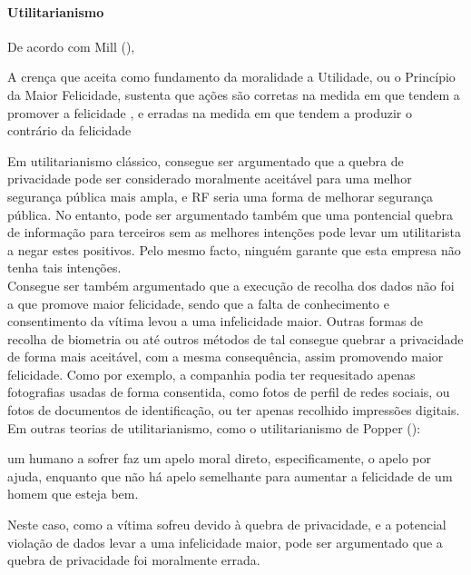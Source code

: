 \documentclass[12pt]{../diazessay}
\begin{document}
\paragraph{Utilitarianismo}
De acordo com Mill (\citeyear{mill}), 
\begin{displayquote}
  A crença que aceita como fundamento da moralidade a Utilidade, ou o Princípio da Maior Felicidade, sustenta que ações são corretas na medida em que tendem a promover a felicidade , e erradas na medida em que tendem a produzir o contrário da felicidade 
\end{displayquote}
Em utilitarianismo clássico, consegue ser argumentado que a quebra de privacidade pode ser considerado moralmente aceitável para uma melhor segurança pública mais ampla, e RF seria uma forma de melhorar segurança pública. No entanto, pode ser argumentado também que uma pontencial quebra de informação para terceiros sem as melhores intenções pode levar um utilitarista a negar estes positivos. Pelo mesmo facto, ninguém garante que esta empresa não tenha tais intenções. \\
Consegue ser também argumentado que a execução de recolha dos dados não foi a que promove maior felicidade, sendo que a falta de conhecimento e consentimento da vítima levou a uma infelicidade maior. Outras formas de recolha de biometria ou até outros métodos de tal consegue quebrar a privacidade de forma mais aceitável, com a mesma consequência, assim promovendo maior felicidade. Como por exemplo, a companhia podia ter requesitado apenas fotografias usadas de forma consentida, como fotos de perfil de redes sociais, ou fotos de documentos de identificação, ou ter apenas recolhido impressões digitais. \\
Em outras teorias de utilitarianismo, como o utilitarianismo de Popper (\citeyear{popper}):
\begin{displayquote}
  \textelp{} um humano a sofrer faz um apelo moral direto, especificamente, o apelo por ajuda, enquanto que não há apelo semelhante para aumentar a felicidade de um homem que esteja bem.
\end{displayquote}
Neste caso, como a vítima sofreu devido à quebra de privacidade, e a potencial violação de dados levar a uma infelicidade maior, pode ser argumentado que a quebra de privacidade foi moralmente errada. \\
\end{document}
